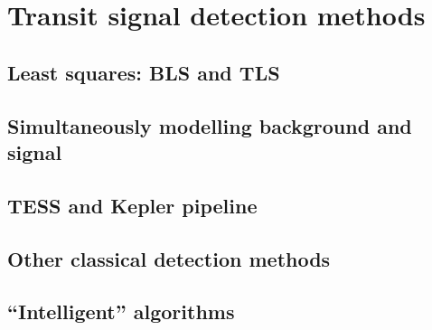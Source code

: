 
\section{Transit signal detection methods}
\red{[TODO]}

\subsection{Least squares: BLS and TLS}
\red{[TODO]}
\subsection{Simultaneously modelling background and signal}
\red{[TODO]}
\subsection{TESS and Kepler pipeline}
\red{[TODO]}
\subsection{Other classical detection methods}
\red{[TODO]}
\subsection{``Intelligent'' algorithms}
\red{[TODO]}